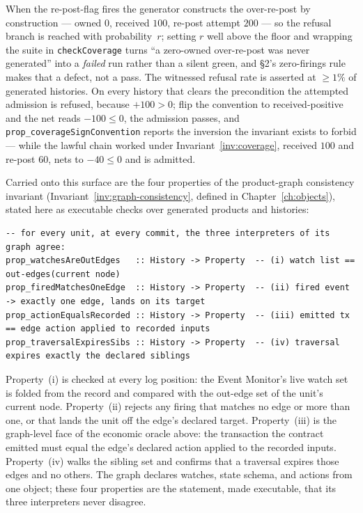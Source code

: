 When the re-post-flag fires the generator constructs the over-re-post by construction
--- owned $0$, received $100$, re-post attempt $200$ --- so the refusal branch is
reached with probability~$r$; setting $r$ well above the floor and wrapping the suite
in \texttt{checkCoverage} turns ``a zero-owned over-re-post was never generated'' into
a \emph{failed} run rather than a silent green, and \S 2's zero-firings rule makes that
a defect, not a pass. The witnessed refusal rate is asserted at $\ge 1\%$ of generated
histories. On every history that clears the precondition the attempted admission is
refused, because $+100 > 0$; flip the convention to received-positive and the net reads
$-100 \le 0$, the admission passes, and \texttt{prop\_coverageSignConvention} reports
the inversion the invariant exists to forbid --- while the lawful chain worked under
Invariant~\ref{inv:coverage}, received $100$ and re-post $60$, nets to $-40 \le 0$ and
is admitted.

Carried onto this surface are the four properties of the product-graph consistency invariant
(Invariant~\ref{inv:graph-consistency}, defined in Chapter~\ref{ch:objects}), stated here as
executable checks over generated products and histories:

\begin{lstlisting}
-- for every unit, at every commit, the three interpreters of its graph agree:
prop_watchesAreOutEdges   :: History -> Property  -- (i) watch list == out-edges(current node)
prop_firedMatchesOneEdge  :: History -> Property  -- (ii) fired event -> exactly one edge, lands on its target
prop_actionEqualsRecorded :: History -> Property  -- (iii) emitted tx == edge action applied to recorded inputs
prop_traversalExpiresSibs :: History -> Property  -- (iv) traversal expires exactly the declared siblings
\end{lstlisting}

Property~(i) is checked at every log position: the Event Monitor's live watch set is folded
from the record and compared with the out-edge set of the unit's current node. Property~(ii)
rejects any firing that matches no edge or more than one, or that lands the unit off the
edge's declared target. Property~(iii) is the graph-level face of the economic oracle above:
the transaction the contract emitted must equal the edge's declared action applied to the
recorded inputs. Property~(iv) walks the sibling set and confirms that a traversal expires
those edges and no others. The graph declares watches, state schema, and actions from one
object; these four properties are the statement, made executable, that its three interpreters
never disagree.

